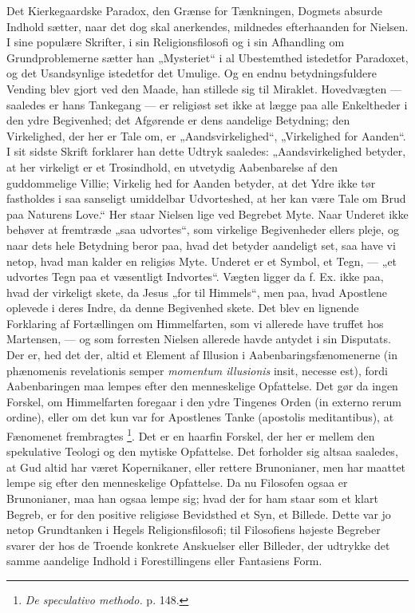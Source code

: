 \documentclass[12pt,a4paper,openany]{book}
\newcommand{\opage}[1]{\marginnote{\footnotesize\textit{[#1]}}}
\begin{document}
Det Kierkegaardske Paradox, den Grænse for Tænkningen, Dogmets absurde Indhold
sætter, naar det dog skal anerkendes, mildnedes efterhaanden for Nielsen. I
sine populære Skrifter, i sin Religionsfilosofi og i sin Afhandling om
Grundproblemerne sætter han „Mysteriet“ i al Ubestemthed istedetfor Paradoxet,
og det Usandsynlige istedetfor det Umulige. Og en endnu betydningsfuldere
Vending blev gjort ved den Maade, han stillede sig til Miraklet. Hovedvægten
--- saaledes er hans Tankegang --- er religiøst set ikke at lægge paa alle
Enkeltheder i den ydre Begivenhed; det Afgørende er dens aandelige Betydning;
den Virkelighed, der her er Tale om, er „Aandsvirkelighed“, „Virkelighed for
Aanden“. I sit sidste Skrift forklarer han dette Udtryk saaledes:
„Aandsvirkelighed betyder, at her virkeligt er et Trosindhold, en utvetydig
Aabenbarelse af den guddommelige Villie; Virkelig%
\setcounter{footnote}{0}%
\opage{193}hed for Aanden betyder, at det Ydre ikke tør fastholdes i saa
sanseligt umiddelbar Udvorteshed, at her kan være Tale om Brud paa Naturens
Love.“ Her staar Nielsen lige ved Begrebet Myte. Naar Underet ikke behøver at
fremtræde „saa udvortes“, som virkelige Begivenheder ellers pleje, og naar dets
hele Betydning beror paa, hvad det betyder aandeligt set, saa have vi netop,
hvad man kalder en religiøs Myte. Underet er et Symbol, et Tegn, --- „et
udvortes Tegn paa et væsentligt Indvortes“. Vægten ligger da f. Ex. ikke paa,
hvad der virkeligt skete, da Jesus „for til Himmels“, men paa, hvad Apostlene
oplevede i deres Indre, da denne Begivenhed skete. Det blev en lignende
Forklaring af Fortællingen om Himmelfarten, som vi allerede have truffet hos
Martensen, --- og som forresten Nielsen allerede havde antydet i sin Disputats.
Der er, hed det der, altid et Element af Illusion i Aabenbaringsfænomenerne (in
phænomenis revelationis semper \textit{momentum illusionis} insit, necesse
est), fordi Aabenbaringen maa lempes efter den menneskelige Opfattelse. Det gør
da ingen Forskel, om Himmelfarten foregaar i den ydre Tingenes Orden (in
externo rerum ordine), eller om det kun var for Apostlenes Tanke (apostolis
meditantibus), at Fænomenet frembragtes%
\footnote[1]{\textit{De speculativo methodo.} p. 148.}. Det er en haarfin
Forskel, der her er mellem den spekulative Teologi og den mytiske Opfattelse.
Det forholder sig altsaa saaledes, at Gud altid har været Kopernikaner, eller
rettere Brunonianer, men har maattet lempe sig efter den menneskelige
Opfattelse. Da nu Filosofen ogsaa er Brunonianer, maa han ogsaa lempe sig; hvad
der for ham staar som et klart Begreb, er for den positive religiøse Bevidsthed
et Syn, et Billede. Dette var jo netop Grundtanken i Hegels Religionsfilosofi;
til Filosofiens højeste Begreber svarer der hos de Troende konkrete Anskuelser
eller Billeder, der udtrykke det samme aandelige Indhold i Forestillingens
eller Fantasiens Form.
\end{document}
